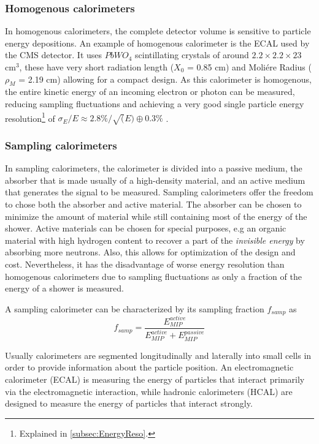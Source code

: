 \subsubsection*{Homogenous calorimeters}

In homogenous calorimeters, the complete detector volume is sensitive to particle energy depositions. An example of homogenous calorimeter is the ECAL used by the CMS detector. It uses $PbWO_4$ scintillating crystals of around $2.2 \times 2.2 \times 23$ cm$^3$, these have very short radiation length ($X_0$ = 0.85 cm) and Moli\'ere Radius ($\rho_M$ = 2.19 cm) allowing for a compact design. As this calorimeter is homogenous, the entire kinetic energy of an incoming electron or photon can be measured, reducing sampling fluctuations and achieving a very good single particle energy resolution\footnote{Explained in \ref{subsec:EnergyReso}.} of $\sigma_E/E \approx 2.8\%/\sqrt(E) \oplus 0.3\%$ \cite{1742-6596-587-1-012001}.

\subsubsection*{Sampling calorimeters}

In sampling calorimeters, the calorimeter is divided into a passive medium, the absorber that is made usually of a high-density material, and an active medium that generates the signal to be measured. Sampling calorimeters offer the freedom to chose both the absorber and active material. The absorber can be chosen to minimize the amount of material while still containing most of the energy of the shower. Active materials can be chosen for special purposes, e.g an organic material with high hydrogen content to recover a part of the \textit{invisible energy} by absorbing more neutrons. Also, this allows for optimization of the design and cost. Nevertheless, it has the disadvantage of worse energy resolution than homogenous calorimeters due to sampling fluctuations as only a fraction of the energy of a shower is measured.

A sampling calorimeter can be characterized by its sampling fraction $f_{samp}$ as
\begin{equation}
  f_{samp} = \frac{E_{MIP}^{active}}{E_{MIP}^{active} + E_{MIP}^{passive}}
\end{equation}

Usually calorimeters are segmented longitudinally and laterally into small cells in order to provide information about the particle position. An electromagnetic calorimeter (ECAL) is measuring the energy of particles that interact primarily via the electromagnetic interaction, while hadronic calorimeters (HCAL) are designed to measure the energy of particles that interact strongly.

